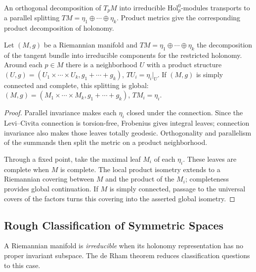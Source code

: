 An orthogonal decomposition of $T_pM$ into irreducible
$\mathrm{Hol}_p^0$-modules transports to a parallel splitting
$TM=\eta_1\oplus\cdots\oplus\eta_k$. Product metrics give the corresponding
product decomposition of holonomy.

\begin{theorem}
  \label{thm:pet-ch10-de-rham-decomposition}
  Let $(M,g)$ be a Riemannian manifold and $TM=\eta_1\oplus\cdots\oplus\eta_k$
  the decomposition of the tangent bundle into irreducible components for the
  restricted holonomy. Around each $p\in M$ there is a neighborhood $U$ with a
  product structure $(U,g)=(U_1\times\cdots\times U_k,g_1+\cdots+g_k)$,
  $TU_i=\eta_i|_U$. If $(M,g)$ is simply connected and complete, this splitting
  is global: $(M,g)=(M_1\times\cdots\times M_k,g_1+\cdots+g_k)$, $TM_i=\eta_i$.
\end{theorem}
\begin{proof}
  \sketch
  Parallel invariance makes each $\eta_i$ closed under the connection. Since
  the Levi--Civita connection is torsion-free, Frobenius gives integral leaves;
  connection invariance also makes those leaves totally geodesic. Orthogonality
  and parallelism of the summands then split the metric on a product
  neighborhood.

  Through a fixed point, take the maximal leaf $M_i$ of each $\eta_i$. These
  leaves are complete when $M$ is complete. The local product isometry extends
  to a Riemannian covering between $M$ and the product of the $M_i$; completeness
  provides global continuation. If $M$ is simply connected, passage to the
  universal covers of the factors turns this covering into the asserted global
  isometry.
\end{proof}

\subsection{Rough Classification of Symmetric Spaces}

A Riemannian manifold is \emph{irreducible} when its holonomy representation
has no proper invariant subspace. The de Rham theorem reduces classification
questions to this case.

